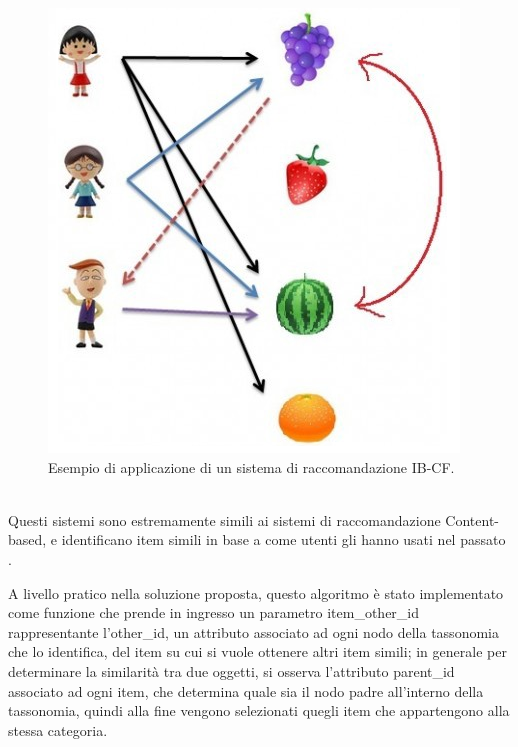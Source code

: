 \begin{figure}[ht!]
	\centering
	\includegraphics[scale=0.5]{images/IB_CF_ex.png}
	\caption{Esempio di applicazione di un sistema di raccomandazione IB-CF.}
	\label{fig:IB_CF}
\end{figure}
\ \\
Questi sistemi sono estremamente simili ai sistemi di raccomandazione Content-based, e identificano item simili in base a come utenti gli
hanno usati nel passato \cite{item-based-collaborative-filtering}.

A livello pratico nella soluzione proposta, questo algoritmo è stato implementato come funzione che prende in ingresso un 
parametro item\_other\_id rappresentante l'other\_id, un attributo associato ad ogni nodo della tassonomia che lo identifica,
del item su cui si vuole ottenere altri item simili; in generale per determinare la similarità tra due oggetti, si osserva 
l'attributo parent\_id associato ad ogni item, che determina quale sia il nodo padre all'interno della tassonomia, quindi alla fine 
vengono selezionati quegli item che appartengono alla stessa categoria.\\

